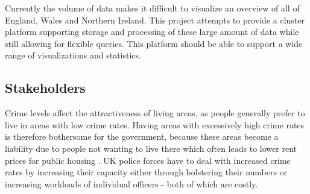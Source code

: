\documentclass[main.tex]{subfiles}
\begin{document}
Currently the volume of data makes it difficult to visualize an overview of all of England, Wales and Northern Ireland. This project attempts to provide a cluster platform supporting storage and processing of these large amount of data while still allowing for flexible queries. This platform should be able to support a wide range of visualizations and statistics.




\subsection{Stakeholders}
Crime levels affect the attractiveness of living areas, as people generally prefer to live in areas with low crime rates. Having areas with excessively high crime rates is therefore bothersome for the government, because these areas become a liability due to people not wanting to live there which often leads to lower rent prices for public housing \cite{rentVsCrime}. UK police forces have to deal with increased crime rates by increasing their capacity either through bolstering their numbers or increasing workloads of individual officers - both of which are costly. \\

\end{document}
